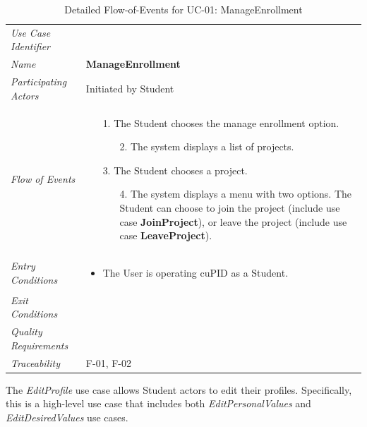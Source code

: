\documentclass[12pt,letterpaper]{article}
\begin{document}
\begin{table}[H]
	\caption{Detailed Flow-of-Events for UC-01: ManageEnrollment}
	\begin{tabu} to 
		\toprule
		Use Case Identifier & \manageenrollment{} \\
		Name & {\bf ManageEnrollment} \\
		Participating Actors & Initiated by Student \\
		Flow of Events & 
		\begin{minipage}[t]{\linewidth}
		    \begin{enumerate}
			    \item[1.] The Student chooses the manage enrollment option.
			    \begin{enumerate}
			        \item[2.] The system displays a list of projects.
				\end{enumerate}
				\item[3.] The Student chooses a project.
				\begin{enumerate}
				    \item[4.] The system displays a menu with two options. The Student can choose to join the project (include use case \textbf{JoinProject}), or leave the project (include use case \textbf{LeaveProject}).
				\end{enumerate}
	        \end{enumerate}
		\end{minipage} \\

		Entry Conditions &
		\begin{minipage}[t]{\linewidth}
			\begin{itemize}
			    \item The User is operating cuPID as a Student.
	        \end{itemize}
		\end{minipage} \\

		Exit Conditions & \\


		Quality Requirements & \\

		Traceability & F-01, F-02\\
		\toprule
	\end{tabu}
\end{table}

\newpage{}

The {\it EditProfile} use case allows Student actors to edit their profiles. Specifically, this is a high-level use case that includes both {\it EditPersonalValues} and {\it EditDesiredValues} use cases.
\end{document}
